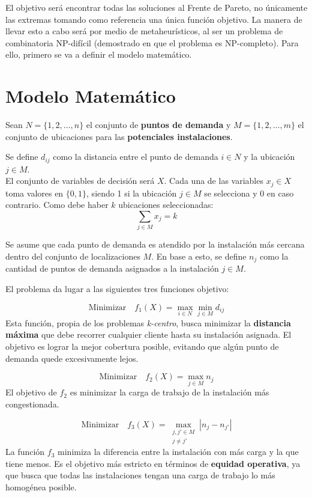 \documentclass[12pt,a4paper]{book}
\begin{document}
El objetivo será encontrar todas las soluciones al Frente de Pareto, no únicamente las extremas tomando como referencia una única
función objetivo. La manera de llevar esto a cabo será por medio de metaheurísticos, al ser un problema de combinatoria NP-difícil (demostrado en \cite{k-balanced_1} que el problema es NP-completo). Para ello, 
primero se va a definir el modelo matemático.

\section{Modelo Matemático}
Sean $N=\{1, 2, \dots, n\}$ el conjunto de \textbf{puntos de demanda} y $M=\{1, 2, \dots, m\}$ el conjunto de ubicaciones para las \textbf{potenciales instalaciones}.

Se define $d_{ij}$ como la distancia entre el punto de demanda $i \in N$ y la ubicación $j \in M$.\\
El conjunto de variables de decisión será $X$. Cada una de las variables $x_j \in X$ toma valores en $\{0,1\}$, siendo 1 si la ubicación $j \in M$ se selecciona y 0 en caso contrario. Como debe haber $k$ ubicaciones seleccionadas:
\begin{equation}
    \sum_{j \in M} x_j = k
\end{equation}

Se asume que cada punto de demanda es atendido por la instalación más cercana dentro del conjunto de localizaciones $M$. En base a esto, se define $n_j$ como la cantidad de puntos de demanda asignados a la instalación $j \in M$.

El problema da lugar a las siguientes tres funciones objetivo:

\begin{equation}
    \text{Minimizar} \quad f_1(X) = \max_{i \in N} \min_{j \in M} d_{ij}
    \label{eq:f1}
\end{equation}
Esta función, propia de los problemas \textit{k-centro}, busca minimizar la \textbf{distancia máxima} que debe recorrer cualquier cliente hasta su instalación asignada. El objetivo es lograr la mejor cobertura posible, evitando que algún punto de demanda quede excesivamente lejos.

\begin{equation}
    \text{Minimizar} \quad f_2(X) = \max_{j \in M} n_j
    \label{eq:f2}
\end{equation}
El objetivo de $f_2$ es minimizar la carga de trabajo de la instalación más congestionada. 

\begin{equation}
    \text{Minimizar} \quad f_3(X) = \max_{\substack{j, j' \in M \\ j \neq j'}} |n_j - n_{j'}|
    \label{eq:f3}
\end{equation}
La función $f_3$ minimiza la diferencia entre la instalación con más carga y la que tiene menos. Es el objetivo más estricto en términos de \textbf{equidad operativa}, ya que busca que todas las instalaciones tengan una carga de trabajo lo más homogénea posible.
\end{document}
